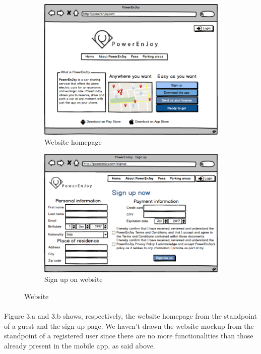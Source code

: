 	\begin{figure}
		\begin{subfigure}{1\textwidth}
			\includegraphics[scale=0.50]{img/mockups/Website.png}
			\caption{Website homepage}
			\label{fig:subim1}
		\end{subfigure}
		\begin{subfigure}{1\textwidth}
			\includegraphics[scale=0.50]{img/mockups/Sign_up.png}
			\caption{Sign up on website}
			\label{fig:subim2}
		\end{subfigure}
		
		\caption{Website}
		\label{fig:image3}
	\end{figure}

	\paragraph{} Figure 3.a and 3.b shows, respectively, the website homepage from the standpoint of a guest and the sign up page. We haven't drawn the website mockup from the standpoint of a registered user since there are no more functionalities than those already present in the mobile app, as said above.


